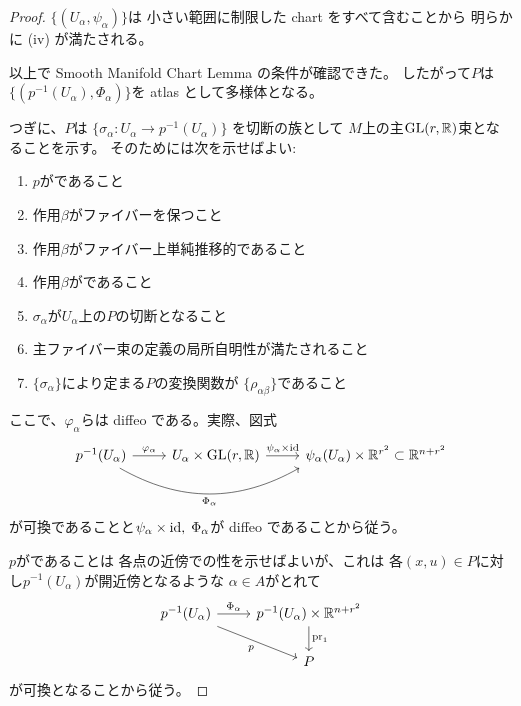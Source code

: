\documentclass[report]{jlreq}
\begin{document}
\begin{proof}
    $\{ (U_\alpha, \psi_\alpha) \}$は
    小さい範囲に制限した chart をすべて含むことから
    明らかに (iv) が満たされる。

    以上で Smooth Manifold Chart Lemma の条件が確認できた。
    したがって$P$は
    $\{ (p^{-1}(U_\alpha), \Phi_\alpha) \}$を atlas として多様体となる。

    つぎに、$P$は
    $\{ \sigma_\alpha \colon U_\alpha \to p^{-1}(U_\alpha) \}$
    を切断の族として
    $M$上の主$\operatorname{\mathrm{GL}}(r, \mathbb{R})$束となることを示す。
    そのためには次を示せばよい:
    \begin{enumerate}
        \item $p$が{\smooth}であること
        \item 作用$\beta$がファイバーを保つこと
        \item 作用$\beta$がファイバー上単純推移的であること
        \item 作用$\beta$が{\smooth}であること
        \item $\sigma_\alpha$が$U_\alpha$上の$P$の切断となること
        \item 主ファイバー束の定義の局所自明性が満たされること
        \item $\{ \sigma_\alpha \}$により定まる$P$の変換関数が
            $\{ \rho_{\alpha\beta} \}$であること
    \end{enumerate}
    ここで、$\varphi_\alpha$らは diffeo である。実際、図式
    \begin{equation}
        \begin{tikzcd}
            p^{-1}(U_\alpha)
                \ar{r}{\varphi_\alpha}
                \ar[bend right=30, end anchor=south west]{rr}[swap]{\Phi_\alpha}
                & U_\alpha \times \GL(r, \R)
                \ar{r}{\psi_\alpha \times \id}
                & \psi_\alpha(U_\alpha) \times \R^{r^2}
                \subset \R^{n + r^2}
        \end{tikzcd}
    \end{equation}
    が可換であることと$\psi_\alpha \times \mathrm{id}, \; \Phi_\alpha$が
    diffeo であることから従う。

    $p$が{\smooth}であることは
    各点の近傍での{\smooth}性を示せばよいが、これは
    各$(x, u) \in P$に対し$p^{-1}(U_\alpha)$が開近傍となるような
    $\alpha \in A$がとれて
    \begin{equation}
        \begin{tikzcd}
            p^{-1}(U_\alpha)
                \ar{rd}[swap]{p}
                \ar{r}{\Phi_\alpha}
                & p^{-1}(U_\alpha) \times \R^{n + r^2}
                \ar{d}{\mathrm{pr}_1} \\
            & P
        \end{tikzcd}
    \end{equation}
    が可換となることから従う。


\end{proof}
\end{document}
